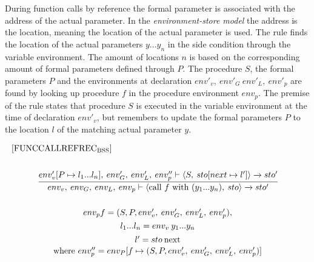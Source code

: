 During function calls by reference the formal parameter is associated with the address of the actual parameter. In the \textit{environment-store model} the address is the location, meaning the location of the actual parameter is used. The rule finds the location of the actual parameters $y...y_n$ in the side condition through the variable environment. The amount of locations $n$ is based on the corresponding amount of formal parameters defined through $P$. The procedure $S$, the formal parameters $P$ and the environments at declaration $env'_v, \: env'_G \: env'_L, \: env'_p$ are found by looking up procedure $f$ in the procedure environment $env_p$. The premise of the rule states that procedure $S$ is executed in the variable environment at the time of declaration $env'_v$, but remembers to update the formal parameters $P$ to the location $l$ of the matching actual parameter $y$.

\begin{equation} \label{EQ:FormelFUNCCALLREFREC}
\begin{split}
\begin{minipage}{\linewidth}
$[\text{FUNCCALLREFREC}_\text{BSS}]$
\end{minipage}
\\\\
\begin{minipage}{\linewidth}
\centering
$\cfrac{env'_v[P \mapsto l_1...l_n], \: env'_G, \: env'_L, \: env''_p \vdash \langle S, \: sto[next \mapsto l'] \rangle \xrightarrow{} sto'}{env_v, \: env_G, \: env_L, \: env_p \vdash \langle \text{call } f \text{ with } (y_1...y_n), \: sto \rangle \xrightarrow{} sto'}$
\end{minipage}
\\\\
\begin{minipage}{\linewidth}
\centering
$env_p f = (S, P, env'_v, \: env_G', \: env'_L, \: env'_p),$
\end{minipage}
\\
\begin{minipage}{\linewidth}
\centering
$l_1... l_n = env_v \: y_1... y_n$
\end{minipage}
\\
\begin{minipage}{\linewidth}
\centering
$l' = sto \: \text{next}$
\end{minipage}
\\
\begin{minipage}{\linewidth}
\centering
where $env''_p = env_P[f \mapsto (S, P, env'_v, \: env_G', \: env'_L, \: env'_p)]$
\end{minipage}
\end{split}
\end{equation}


